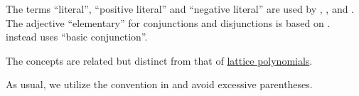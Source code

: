 \begin{comments}
  \item The terms \enquote{literal}, \enquote{positive literal} and \enquote{negative literal} are used by , ,  and . The adjective \enquote{elementary} for conjunctions and disjunctions is based on \cite[36]{Эдельман1975Логика}.  instead uses \enquote{basic conjunction}.
  \item The concepts are related but distinct from that of \hyperref[rem:lattice_polynomials]{lattice polynomials}.
  \item As usual, we utilize the convention in  and avoid excessive parentheses.
\end{comments}

